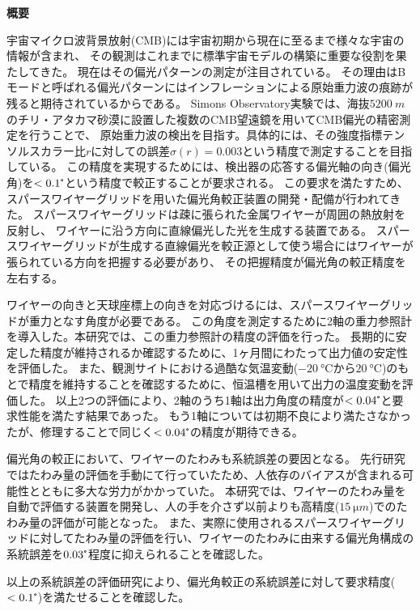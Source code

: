 \documentclass[../../main.tex]{subfiles}
\begin{document}
\begin{center}
\Large\textbf{概要}
\end{center}
\indent 

宇宙マイクロ波背景放射(CMB)には宇宙初期から現在に至るまで様々な宇宙の情報が含まれ、
その観測はこれまでに標準宇宙モデルの構築に重要な役割を果たしてきた。
現在はその偏光パターンの測定が注目されている。
その理由はBモードと呼ばれる偏光パターンにはインフレーションによる原始重力波の痕跡が残ると期待されているからである。
Simons Observatory実験では、海抜$\SI{5200}{m}$のチリ・アタカマ砂漠に設置した複数のCMB望遠鏡を用いてCMB偏光の精密測定を行うことで、
原始重力波の検出を目指す。具体的には、その強度指標テンソルスカラー比$r$に対しての誤差$\sigma(r)=0.003$という精度で測定することを目指している。
この精度を実現するためには、検出器の応答する偏光軸の向き(偏光角)を$<0.1\tcdegree$という精度で較正することが要求される。
この要求を満たすため、スパースワイヤーグリッドを用いた偏光角較正装置の開発・配備が行われてきた。
スパースワイヤーグリッドは疎に張られた金属ワイヤーが周囲の熱放射を反射し、
ワイヤーに沿う方向に直線偏光した光を生成する装置である。
スパースワイヤーグリッドが生成する直線偏光を較正源として使う場合にはワイヤーが張られている方向を把握する必要があり、
その把握精度が偏光角の較正精度を左右する。

ワイヤーの向きと天球座標上の向きを対応づけるには、スパースワイヤーグリッドが重力となす角度が必要である。
この角度を測定するために2軸の重力参照計を導入した。本研究では、この重力参照計の精度の評価を行った。
長期的に安定した精度が維持されるか確認するために、1ヶ月間にわたって出力値の安定性を評価した。
また、観測サイトにおける過酷な気温変動($\SI{-20}{\degreeCelsius}$から$\SI{20}{\degreeCelsius}$)のもとで精度を維持することを確認するために、恒温槽を用いて出力の温度変動を評価した。
以上2つの評価により、2軸のうち1軸は出力角度の精度が$<0.04\tcdegree$と要求性能を満たす結果であった。
もう1軸については初期不良により満たさなかったが、修理することで同じく$<0.04\tcdegree$の精度が期待できる。

偏光角の較正において、ワイヤーのたわみも系統誤差の要因となる。
先行研究ではたわみ量の評価を手動にて行っていたため、人依存のバイアスが含まれる可能性とともに多大な労力がかかっていた。
本研究では、ワイヤーのたわみ量を自動で評価する装置を開発し、人の手を介さず以前よりも高精度($\SI{15}{\micro m}$)でのたわみ量の評価が可能となった。
また、実際に使用されるスパースワイヤーグリッドに対してたわみ量の評価を行い、ワイヤーのたわみに由来する偏光角構成の系統誤差を$0.03\tcdegree$程度に抑えられることを確認した。

以上の系統誤差の評価研究により、偏光角較正の系統誤差に対して要求精度($<0.1\tcdegree$)を満たせることを確認した。
\end{document}
